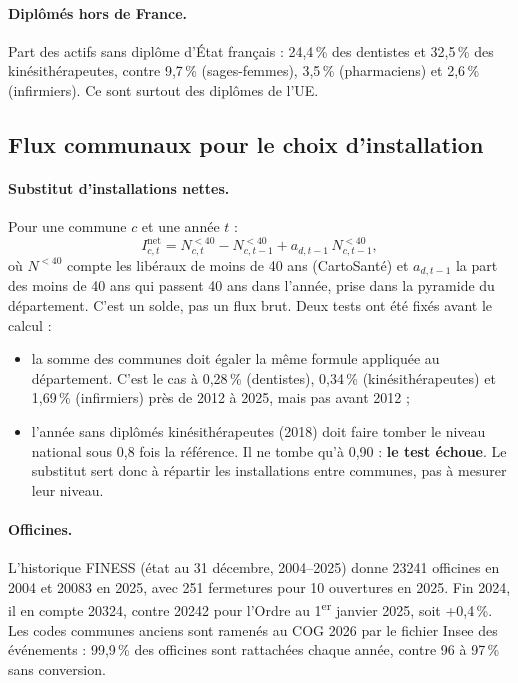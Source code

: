 \paragraph{Diplômés hors de France.} Part des actifs sans diplôme d'État français\mesure{} : 24,4\,\% des
dentistes et 32,5\,\% des kinésithérapeutes, contre 9,7\,\% (sages-femmes), 3,5\,\% (pharmaciens) et
2,6\,\% (infirmiers). Ce sont surtout des diplômes de l'UE.

\subsection{Flux communaux pour le choix d'installation}\label{a4-sec:res-flux}
\paragraph{Substitut d'installations nettes.} Pour une commune $c$ et une année $t$ :
\begin{equation}
I^{\mathrm{net}}_{c,t} = N^{<40}_{c,t} - N^{<40}_{c,t-1} + a_{d,t-1}\, N^{<40}_{c,t-1},
\end{equation}
où $N^{<40}$ compte les libéraux de moins de 40 ans (CartoSanté) et $a_{d,t-1}$ la part des moins de 40 ans qui
passent 40 ans dans l'année, prise dans la pyramide du département. C'est un solde, pas un flux brut. Deux tests
ont été fixés avant le calcul :
\begin{itemize}
  \item la somme des communes doit égaler la même formule appliquée au département. C'est le cas à
  0,28\,\% (dentistes), 0,34\,\% (kinésithérapeutes) et 1,69\,\% (infirmiers) près de 2012 à 2025\mesure{},
  mais pas avant 2012 ;
  \item l'année sans diplômés kinésithérapeutes (2018) doit faire tomber le niveau national sous 0,8 fois la
  référence. Il ne tombe qu'à 0,90\mesure{} : \textbf{le test échoue}. Le substitut sert donc à répartir les
  installations entre communes, pas à mesurer leur niveau.
\end{itemize}

\paragraph{Officines.} L'historique FINESS (état au 31 décembre, 2004--2025) donne \num{23241} officines en
2004 et \num{20083} en 2025\mesure{}, avec 251 fermetures pour 10 ouvertures en 2025. Fin 2024, il en compte
\num{20324}, contre \num{20242} pour l'Ordre au 1\textsuperscript{er} janvier 2025\citep{a4-ordre2025demo}, soit
+0,4\,\%\mesure{}. Les codes communes anciens sont ramenés au COG 2026 par le fichier Insee des événements
\citep{a4-insee2026cog} : 99,9\,\% des officines sont rattachées chaque année, contre 96 à 97\,\% sans
conversion\mesure{}.

